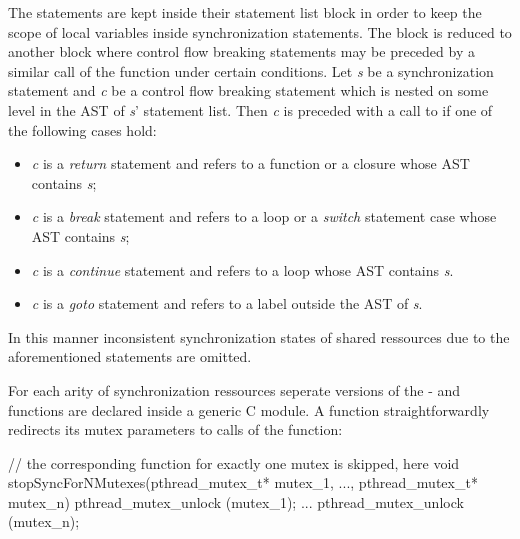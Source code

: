 The statements are kept inside their statement list block in order to keep the scope of local variables inside synchronization statements. The block is reduced to another block where control flow breaking statements may be preceded by a similar call of the  function under certain conditions. Let \textit{s} be a synchronization statement and \textit{c} be a control flow breaking statement which is nested on some level in the AST of \textit{s}' statement list. Then \textit{c} is preceded with a call to  if one of the following cases hold:
\begin{itemize}
\item \textit{c} is a \textit{return} statement and refers to a function or a closure whose AST contains \textit{s};
\item \textit{c} is a \textit{break} statement and refers to a loop or a \textit{switch} statement case whose AST contains \textit{s};
\item \textit{c} is a \textit{continue} statement and refers to a loop whose AST contains \textit{s}.
\item \textit{c} is a \textit{goto} statement and refers to a label outside the AST of \textit{s}.
\end{itemize}
In this manner inconsistent synchronization states of shared ressources due to the aforementioned statements are omitted. 

For each arity of synchronization ressources seperate versions of the - and  functions are declared inside a generic C module. A  function straightforwardly redirects its mutex parameters to calls of the  function:
\begin{ccode}
// the corresponding function for exactly one mutex is skipped, here
void stopSyncForNMutexes(pthread_mutex_t* mutex_1, ..., pthread_mutex_t* mutex_n) { 
  pthread_mutex_unlock (mutex_1);
  ...
  pthread_mutex_unlock (mutex_n); 
}
\end{ccode}

